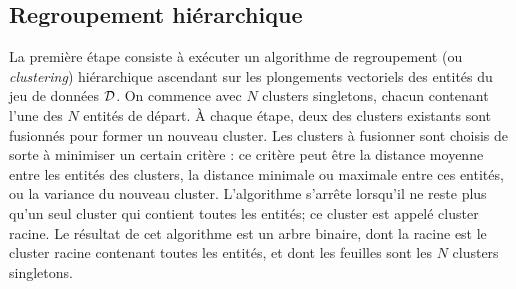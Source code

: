 




\subsection{Regroupement hiérarchique}
\label{subsec:te-clustering}

La première étape consiste à exécuter un algorithme de regroupement (ou \textit{clustering}) hiérarchique ascendant sur les plongements vectoriels des entités du jeu de données $\cal{D}$. %
On commence avec $N$ clusters singletons, chacun contenant l'une des $N$ entités de départ. À chaque étape, deux des clusters existants sont fusionnés pour former un nouveau cluster. Les clusters à fusionner sont choisis de sorte à minimiser un certain critère : ce critère peut être la distance moyenne entre les entités des clusters, la distance minimale ou maximale entre ces entités, ou la variance du nouveau cluster. 
L'algorithme s'arrête lorsqu'il ne reste plus qu'un seul cluster qui contient toutes les entités; ce cluster est appelé cluster racine. Le résultat de cet algorithme est un arbre binaire, dont la racine est le cluster racine contenant toutes les entités, et dont les feuilles sont les $N$ clusters singletons.

